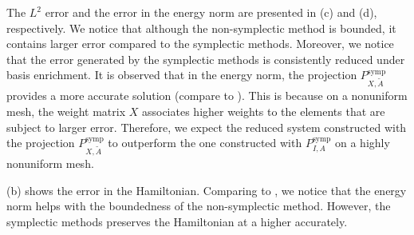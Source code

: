 The $L^2$ error and the error in the energy norm are presented in (c) and (d), respectively. We notice that although the non-symplectic method is bounded, it contains larger error compared to the symplectic methods. Moreover, we notice that the error generated by the symplectic methods is consistently reduced under basis enrichment. It is observed that in the energy norm, the projection $P_{X,\tilde A}^{\text{symp}}$ provides a more accurate solution (compare to ). This is because on a nonuniform mesh, the weight matrix $X$ associates higher weights to the elements that are subject to larger error. Therefore, we expect the reduced system constructed with the projection $P_{X,\tilde A}^{\text{symp}}$ to outperform the one constructed with $P_{I,A}^{\text{symp}}$ on a highly nonuniform mesh.

(b) shows the error in the Hamiltonian. Comparing to , we notice that the energy norm helps with the boundedness of the non-symplectic method. However, the symplectic methods preserves the Hamiltonian at a higher accurately.

